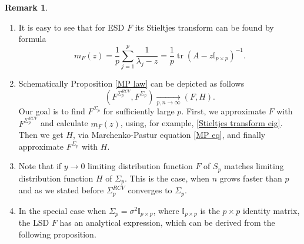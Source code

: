 \documentclass[a4paper,11pt]{article}
\theoremstyle{plain}
\theoremstyle{definition}
\newtheorem{rmrk}[thm]{Remark}
\newcommand{\tr}{\operatorname{tr}}
\begin{document}
	\begin{rmrk} \
		\begin{enumerate}
			\item It is easy to see that for ESD $F$ its Stieltjes transform can be found by formula
			\begin{equation} \label{Stieltjes transform eig}
			m_F(z) = \frac{1}{p} \sum_{j=1}^p \frac{1}{\lambda_j - z} = \frac{1}{p} \tr(A-z\mathbb{I}_{p \times p})^{-1} .
			\end{equation}
			\item Schematically Proposition \ref{MP law} can be depicted as follows
			\[(F^{\Sigma_p^{RCV}}, F^{\Sigma_p}) \xrightarrow[p,n \rightarrow \infty]{} (F, H).\]
			Our goal is to find $F^{\Sigma_p}$ for sufficiently large $p$. First, we approximate $F$ with $F^{\Sigma_p^{RCV}}$ and calculate $m_F(z)$, using, for example, \eqref{Stieltjes transform eig}. Then we get $H$, via Marchenko-Pastur equation \eqref{MP eq}, and finally approximate $F^{\Sigma_p}$ with $H$.
			\item Note that if $y \rightarrow 0$ limiting distribution function $F$ of $S_p$ matches limiting distribution function $H$ of $\Sigma_p$. This is the case, when $n$ grows faster than $p$ and as we stated before $\Sigma_p^{RCV}$ converges to $\Sigma_p$. 
			\item In the special case when $\Sigma_p = \sigma^2 \mathbb{I}_{p \times p}$, where $\mathbb{I}_{p \times p}$ is the $p \times p$ identity matrix, the LSD $F$ has an analytical expression, which can be derived from the following proposition.
		\end{enumerate}
	\end{rmrk}
	
\end{document}
